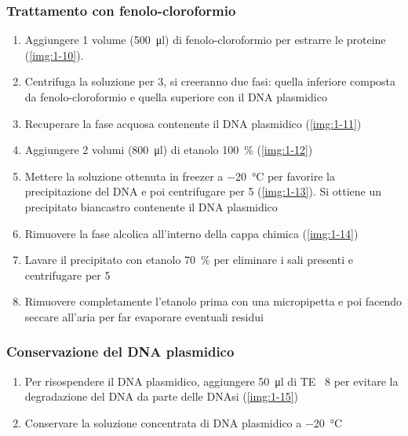 \subsubsection{Trattamento con fenolo-cloroformio}
\begin{enumerate}
	\item Aggiungere 1 volume (\qty{500}{\micro\litre}) di fenolo-cloroformio per estrarre le proteine (\autoref{img:1-10}).  
	\item  Centrifuga la soluzione per \qty{3}{\min}, si creeranno due fasi: quella inferiore composta da fenolo-cloroformio e quella superiore con il DNA plasmidico
	\item Recuperare la fase acquosa contenente il DNA plasmidico (\autoref{img:1-11})
	\item Aggiungere 2 volumi (\qty{800}{\micro\litre}) di etanolo \qty{100}{\percent} (\autoref{img:1-12})
	\item Mettere la soluzione ottenuta in freezer a \qty{-20}{\celsius} per favorire la precipitazione del DNA e poi centrifugare per \qty{5}{\min} (\autoref{img:1-13}). Si ottiene un precipitato biancastro contenente il DNA plasmidico
	\item Rimuovere la fase alcolica all’interno della cappa chimica (\autoref{img:1-14})
	\item Lavare il precipitato con etanolo \qty{70}{\percent} per eliminare i sali presenti e centrifugare per \qty{5}{\min}
	\item Rimuovere completamente l’etanolo prima con una micropipetta e poi facendo seccare all’aria per far evaporare eventuali residui
\end{enumerate}

\subsubsection{Conservazione del DNA plasmidico}
\begin{enumerate}
	\item  Per risospendere il DNA plasmidico, aggiungere \qty{50}{\micro\litre} di TE \pH\ 8 per evitare la degradazione del DNA da parte delle DNAsi (\autoref{img:1-15})
	\item  Conservare la soluzione concentrata di DNA plasmidico a \qty{-20}{\celsius}
\end{enumerate}

\begingroup
\newpage


